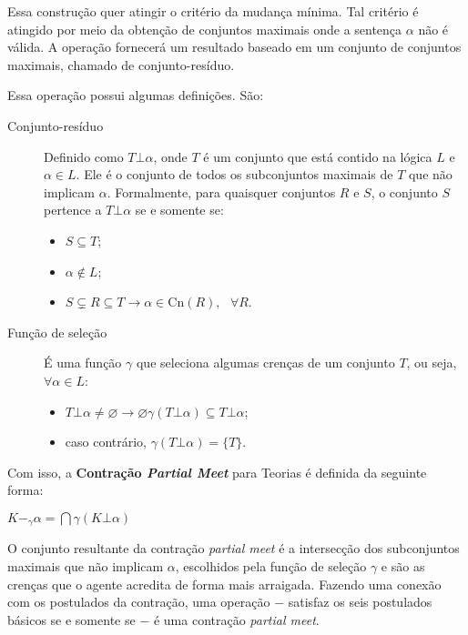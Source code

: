 Essa construção quer atingir o critério da mudança mínima. Tal critério é atingido por meio da obtenção de conjuntos maximais onde a sentença $ \alpha $ não é válida. A operação fornecerá um resultado baseado em um conjunto de conjuntos maximais, chamado de conjunto-resíduo.

Essa operação possui algumas definições. São:

\begin{description}
	\item[Conjunto-resíduo] Definido como $ T \bot \alpha $, onde $ T $ é um conjunto que está contido na lógica $ L $ e $ \alpha \in L $. Ele é o conjunto de todos os subconjuntos maximais de $ T $ que não implicam $ \alpha $. Formalmente, para quaisquer conjuntos $ R $ e $ S $, o conjunto $ S $ pertence a $ T \bot \alpha $ se e somente se:
	\begin{itemize}
		\item $ S \subseteq T $;
		\item $ \alpha \notin L $;
		\item $ S \subsetneq R \subseteq T \to \alpha \in \text{Cn}(R), \text{ }\forall R$.
	\end{itemize}
	\item[Função de seleção] É uma função $ \gamma $ que seleciona algumas crenças de um conjunto $ T $, ou seja, $ \forall \alpha \in L $:
	\begin{itemize}
		\item $ T \bot \alpha \neq \varnothing \to \varnothing \gamma(T \bot \alpha) \subseteq T \bot \alpha $;
		\item caso contrário, $ \gamma(T \bot \alpha) = \{T\} $.
	\end{itemize}
\end{description}

Com isso, a \textbf{Contração \textit{Partial Meet}} para Teorias é definida da seguinte forma: 

\begin{center}
	$ K -_{\gamma} \alpha = \bigcap \gamma(K \bot \alpha) $
\end{center}

O conjunto resultante da contração \textit{partial meet} é a intersecção dos subconjuntos maximais que não implicam $ \alpha $, escolhidos pela função de seleção $ \gamma $ e são as crenças que o agente acredita de forma mais arraigada. Fazendo uma conexão com os postulados da contração, uma operação $ - $ satisfaz os seis postulados básicos se e somente se $ - $ é uma contração \textit{partial meet}.

